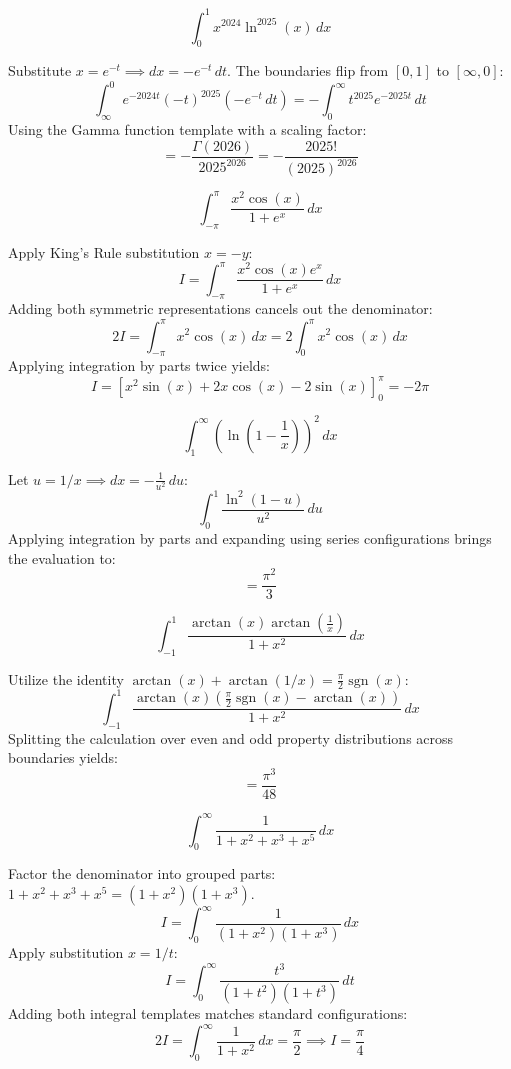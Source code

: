 \begin{questions}

\question
\[ \int_{0}^{1} x^{2024}\ln^{2025}(x) \, dx \]
\begin{solution}
Substitute $x = e^{-t} \implies dx = -e^{-t} \, dt$. The boundaries flip from $[0,1]$ to $[\infty, 0]$:
\[ \int_{\infty}^{0} e^{-2024t}(-t)^{2025}(-e^{-t} \, dt) = -\int_{0}^{\infty} t^{2025}e^{-2025t} \, dt \]
Using the Gamma function template with a scaling factor:
\[ = -\frac{\Gamma(2026)}{2025^{2026}} = -\frac{2025!}{(2025)^{2026}} \]
\end{solution}

\question
\[ \int_{-\pi}^{\pi} \frac{x^{2}\cos(x)}{1+e^{x}} \, dx \]
\begin{solution}
Apply King's Rule substitution $x = -y$:
\[ I = \int_{-\pi}^{\pi} \frac{x^2\cos(x)e^x}{1+e^x} \, dx \]
Adding both symmetric representations cancels out the denominator:
\[ 2I = \int_{-\pi}^{\pi} x^2\cos(x) \, dx = 2\int_{0}^{\pi} x^2\cos(x) \, dx \]
Applying integration by parts twice yields:
\[ I = \left[ x^2\sin(x) + 2x\cos(x) - 2\sin(x) \right]_{0}^{\pi} = -2\pi \]
\end{solution}

\question
\[ \int_{1}^{\infty} \left(\ln\left(1-\frac{1}{x}\right)\right)^{2} \, dx \]
\begin{solution}
Let $u = 1/x \implies dx = -\frac{1}{u^2} \, du$:
\[ \int_{0}^{1} \frac{\ln^2(1-u)}{u^2} \, du \]
Applying integration by parts and expanding using series configurations brings the evaluation to:
\[ = \frac{\pi^2}{3} \]
\end{solution}

\question
\[ \int_{-1}^{1} \frac{\arctan(x)\arctan(\frac{1}{x})}{1+x^{2}} \, dx \]
\begin{solution}
Utilize the identity $\arctan(x) + \arctan(1/x) = \frac{\pi}{2}\operatorname{sgn}(x)$:
\[ \int_{-1}^{1} \frac{\arctan(x)\left(\frac{\pi}{2}\operatorname{sgn}(x)-\arctan(x)\right)}{1+x^2} \, dx \]
Splitting the calculation over even and odd property distributions across boundaries yields:
\[ = \frac{\pi^3}{48} \]
\end{solution}

\question
\[ \int_{0}^{\infty} \frac{1}{1+x^{2}+x^{3}+x^{5}} \, dx \]
\begin{solution}
Factor the denominator into grouped parts: $1+x^2+x^3+x^5 = (1+x^2)(1+x^3)$.
\[ I = \int_{0}^{\infty} \frac{1}{(1+x^2)(1+x^3)} \, dx \]
Apply substitution $x = 1/t$:
\[ I = \int_{0}^{\infty} \frac{t^3}{(1+t^2)(1+t^3)} \, dt \]
Adding both integral templates matches standard configurations:
\[ 2I = \int_{0}^{\infty} \frac{1}{1+x^2} \, dx = \frac{\pi}{2} \implies I = \frac{\pi}{4} \]
\end{solution}


\end{questions}
